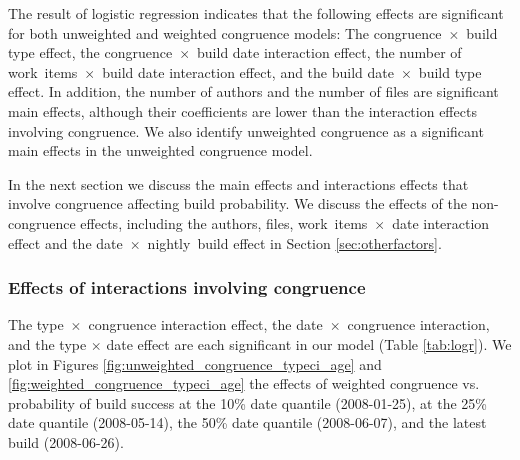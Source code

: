 

The result of logistic regression indicates that the following effects are significant for both unweighted and weighted congruence models: The congruence~$\times$~build type effect, the congruence~$\times$~build date interaction effect, the number of work~items~$\times$~build date interaction effect, and the build date~$\times$~build type effect. In addition, the number of authors and the number of files are significant main effects, although their coefficients are lower than the interaction effects involving congruence. We also identify unweighted congruence as a significant main effects in the unweighted congruence model.

In the next section we discuss the main effects and interactions effects that involve congruence affecting build probability. We discuss the effects of the non-congruence effects, including the authors, files, work~items~$\times$~date interaction effect and the date~$\times$~nightly~build effect in Section \ref{sec:otherfactors}.

\subsubsection{Effects of interactions involving congruence}
\label{sec:congruenceinteractions}

The type~$\times$~congruence interaction effect, the date~$\times$~congruence interaction, and the type $\times$ date effect are each significant in our model (Table \ref{tab:logr}). We plot in Figures \ref{fig:unweighted_congruence_typeci_age} and \ref{fig:weighted_congruence_typeci_age} the effects of weighted congruence vs. probability of build success at the 10\% date quantile (2008-01-25), at the 25\% date quantile (2008-05-14), the 50\% date quantile (2008-06-07), and the latest build (2008-06-26).


